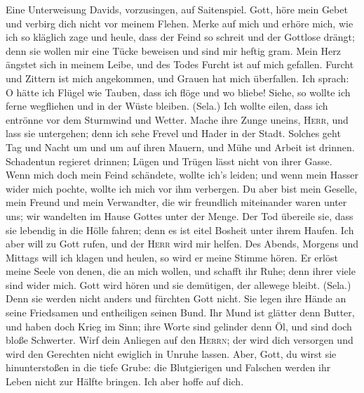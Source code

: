 Eine Unterweisung Davids, vorzusingen, auf Saitenspiel.
 Gott, höre mein Gebet und verbirg dich nicht vor meinem
Flehen.  Merke auf mich und erhöre mich, wie ich so
kläglich zage und heule,  dass der Feind so schreit und
der Gottlose drängt; denn sie wollen mir eine Tücke beweisen und sind
mir heftig gram.  Mein Herz ängstet sich in meinem Leibe,
und des Todes Furcht ist auf mich gefallen.  Furcht und
Zittern ist mich angekommen, und Grauen hat mich überfallen.
 Ich sprach: O hätte ich Flügel wie Tauben, dass ich flöge
und wo bliebe!  Siehe, so wollte ich ferne wegfliehen und
in der Wüste bleiben. (Sela.)  Ich wollte eilen, dass ich
entrönne vor dem Sturmwind und Wetter.  Mache ihre Zunge
uneins, \textsc{Herr}, und lass sie untergehen; denn ich sehe Frevel und
Hader in der Stadt.  Solches geht Tag und Nacht um und um
auf ihren Mauern, und Mühe und Arbeit ist drinnen. 
Schadentun regieret drinnen; Lügen und Trügen lässt nicht von ihrer
Gasse.  Wenn mich doch mein Feind schändete, wollte ich's
leiden; und wenn mein Hasser wider mich pochte, wollte ich mich vor ihm
verbergen.  Du aber bist mein Geselle, mein Freund und
mein Verwandter,  die wir freundlich miteinander waren
unter uns; wir wandelten im Hause Gottes unter der Menge.
 Der Tod übereile sie, dass sie lebendig in die Hölle
fahren; denn es ist eitel Bosheit unter ihrem Haufen. 
Ich aber will zu Gott rufen, und der \textsc{Herr} wird mir helfen.
 Des Abends, Morgens und Mittags will ich klagen und
heulen, so wird er meine Stimme hören.  Er erlöst meine
Seele von denen, die an mich wollen, und schafft ihr Ruhe; denn ihrer
viele sind wider mich.  Gott wird hören und sie
demütigen, der allewege bleibt. (Sela.) Denn sie werden nicht anders und
fürchten Gott nicht.  Sie legen ihre Hände an seine
Friedsamen und entheiligen seinen Bund.  Ihr Mund ist
glätter denn Butter, und haben doch Krieg im Sinn; ihre Worte sind
gelinder denn Öl, und sind doch bloße Schwerter.  Wirf
dein Anliegen auf den \textsc{Herrn}; der wird dich versorgen und wird
den Gerechten nicht ewiglich in Unruhe lassen.  Aber,
Gott, du wirst sie hinunterstoßen in die tiefe Grube: die Blutgierigen
und Falschen werden ihr Leben nicht zur Hälfte bringen. Ich aber hoffe
auf dich.

